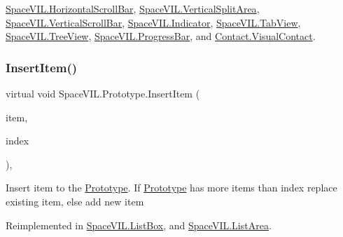 \mbox{\hyperlink{class_space_v_i_l_1_1_horizontal_scroll_bar_a28b7659ed7580fee8b4bf4fb951f1daa}{Space\+V\+I\+L.\+Horizontal\+Scroll\+Bar}}, \mbox{\hyperlink{class_space_v_i_l_1_1_vertical_split_area_ac00bf6f3d89b83dadcdd05f6e95b97d8}{Space\+V\+I\+L.\+Vertical\+Split\+Area}}, \mbox{\hyperlink{class_space_v_i_l_1_1_vertical_scroll_bar_aa74f074945d0b53b3a2dc0eb97904ce1}{Space\+V\+I\+L.\+Vertical\+Scroll\+Bar}}, \mbox{\hyperlink{class_space_v_i_l_1_1_indicator_a787de3f581ef112a306781a4a9722fb5}{Space\+V\+I\+L.\+Indicator}}, \mbox{\hyperlink{class_space_v_i_l_1_1_tab_view_ae19ec535e78dee9eca9ac433e2b2bca5}{Space\+V\+I\+L.\+Tab\+View}}, \mbox{\hyperlink{class_space_v_i_l_1_1_tree_view_ac44a1df7d58a35e35842170162645e08}{Space\+V\+I\+L.\+Tree\+View}}, \mbox{\hyperlink{class_space_v_i_l_1_1_progress_bar_a61f9a8602172eebf205ed6eee8cb3e30}{Space\+V\+I\+L.\+Progress\+Bar}}, and \mbox{\hyperlink{class_contact_1_1_visual_contact_a975573507e5e287632273df844dc7792}{Contact.\+Visual\+Contact}}.

\mbox{\label{class_space_v_i_l_1_1_prototype_a9dd004dfa4ca2ea37c21770a24434270}} 
\subsubsection{\texorpdfstring{Insert\+Item()}{InsertItem()}}
{\footnotesize\ttfamily virtual void Space\+V\+I\+L.\+Prototype.\+Insert\+Item (\begin{DoxyParamCaption}\item[{\mbox{\hyperlink{interface_space_v_i_l_1_1_core_1_1_i_base_item}{I\+Base\+Item}}}]{item,  }\item[{Int32}]{index }\end{DoxyParamCaption})\hspace{0.3cm}{\ttfamily [inline]}, {\ttfamily [virtual]}}



Insert item to the \mbox{\hyperlink{class_space_v_i_l_1_1_prototype}{Prototype}}. If \mbox{\hyperlink{class_space_v_i_l_1_1_prototype}{Prototype}} has more items than index replace existing item, else add new item 



Reimplemented in \mbox{\hyperlink{class_space_v_i_l_1_1_list_box_a3d5da8acbfd4f0bb11594b5f4b9001c0}{Space\+V\+I\+L.\+List\+Box}}, and \mbox{\hyperlink{class_space_v_i_l_1_1_list_area_a44efda800a4a280b7a452bd09c90f484}{Space\+V\+I\+L.\+List\+Area}}.

